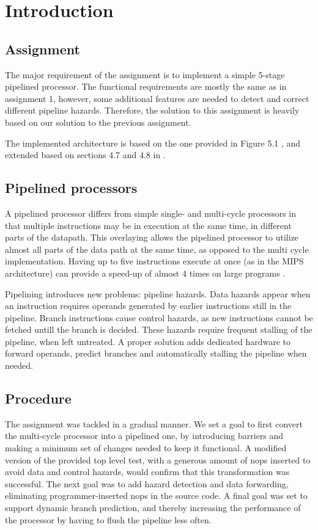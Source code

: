 \chapter{Introduction}

\section{Assignment}
The major requirement of the assignment is to implement a simple 5-stage pipelined processor.
The functional requirements are mostly the same as in assignment 1\cite[p.44]{compendium}, however, some additional features are needed to detect and correct different pipeline hazards.
Therefore, the solution to this assignment is heavily based on our solution to the previous assignment\cite{report-1}.

The implemented architecture is based on the one provided in Figure 5.1 \cite[p.50]{compendium},
and extended based on sections 4.7 and 4.8 in \cite{thebook}.

\section{Pipelined processors}

A pipelined processor differs from simple single- and multi-cycle processors in that multiple instructions may be in execution at the same time, in different parts of the datapath.
This overlaying allows the pipelined processor to utilize almost all parts of the data path at the same time, as opposed to the multi cycle implementation.
Having up to five instructions execute at once (as in the MIPS architecture) can provide a speed-up of almost 4 times on large programs \cite[p.276]{thebook}.

Pipelining introduces new problems: pipeline hazards.
Data hazards appear when an instruction requires operands generated by earlier instructions still in the pipeline.
Branch instructions cause control hazards, as new instructions cannot be fetched untill the branch is decided.
These hazards require frequent stalling of the pipeline, when left untreated.
A proper solution adds dedicated hardware to forward operands, predict branches and automatically stalling the pipeline when needed.

\section{Procedure}

The assignment was tackled in a gradual manner.
We set a goal to first convert the multi-cycle processor into a pipelined one, by introducing barriers and making a minimum set of changes needed to keep it functional.
A modified version of the provided top level test, with a generous amount of nops inserted to avoid data and control hazards, would confirm that this transformation was successful.
The next goal was to add hazard detection and data forwarding, eliminating programmer-inserted nops in the source code.
A final goal was set to support dynamic branch prediction, and thereby increasing the performance of the processor by having to flush the pipeline less often.
